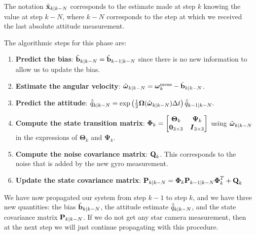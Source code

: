The notation $\tilde{\textrm{\textbf{x}}}_{k|k-N}$ corresponds to the estimate made at step $k$ knowing the value at step $k-N$, where $k-N$ corresponds to the step at which we received the last absolute attitude measurement. 

The algorithmic steps for this phase are:
\begin{enumerate}
\item \textbf{Predict the bias}: $\hat{\textrm{\textbf{b}}}_{k|k-N} = \hat{\textrm{\textbf{b}}}_{k-1|k-N}$ since there is no new information to allow us to update the bias.
\item \textbf{Estimate the angular velocity}: $\hat{\boldsymbol\omega}_{k|k-N} = \boldsymbol\omega_k^{\textrm{meas}} - \hat{\textrm{\textbf{b}}}_{k|k-N}$.
\item \textbf{Predict the attitude}: $\hat{\bar{q}}_{k|k-N} = \exp\left(\frac{1}{2}\boldsymbol\Omega(\hat{\boldsymbol\omega}_{k|k-N})\Delta t\right)\hat{\bar{q}}_{k-1|k-N}.$
\item \textbf{Compute the state transition matrix}: $\boldsymbol{\Phi}_k = \begin{bmatrix} \boldsymbol{\Theta}_k & \boldsymbol{\Psi}_k \\ \boldsymbol{0}_{3\times 3} & \boldsymbol{I}_{3\times 3}\end{bmatrix}$ using $\hat{\boldsymbol\omega}_{k|k-N}$ in the expressions of $\boldsymbol{\Theta}_k$ and $\boldsymbol{\Psi}_k$.
\item \textbf{Compute the noise covariance matrix}: $\textrm{\textbf{Q}}_k$. This corresponds to the noise that is added by the new gyro measurement.
\item \textbf{Update the state covariance matrix}: $\textrm{\textbf{P}}_{k|k-N}  =   \boldsymbol{\Phi}_k \textrm{\textbf{P}}_{k-1|k-N}\boldsymbol{\Phi}^T_k + \textrm{\textbf{Q}}_k$
\end{enumerate}
We have now propagated our system from step $k-1$ to step $k$, and we have three new quantities: the bias $\hat{\textrm{\textbf{b}}}_{k|k-N}$, the attitude estimate $\hat{\bar{q}}_{k|k-N}$, and the state covariance matrix $\textrm{\textbf{P}}_{k|k-N} $. If we do not get any star camera measurement, then at the next step we will just continue propagating with this procedure.

